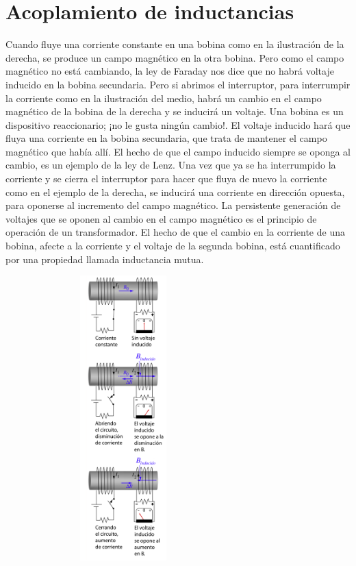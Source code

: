 \documentclass[a4paper,11pt]{report}
\begin{document}
\chapter{Acoplamiento de inductancias}
Cuando fluye una corriente constante en una bobina como en la ilustración de la derecha, se produce un campo magnético en la otra bobina. Pero como el campo magnético no está cambiando, la ley de Faraday nos dice que no habrá voltaje inducido en la bobina secundaria. Pero si abrimos el interruptor, para interrumpir la corriente como en la ilustración del medio, habrá un cambio en el campo magnético de la bobina de la derecha y se inducirá un voltaje. Una bobina es un dispositivo reaccionario; ¡no le gusta ningún cambio!. El voltaje inducido hará que fluya una corriente en la bobina secundaria, que trata de mantener el campo magnético que había allí. El hecho de que el campo inducido siempre se oponga al cambio, es un ejemplo de la ley de Lenz. Una vez que ya se ha interrumpido la corriente y se cierra el interruptor para hacer que fluya de nuevo la corriente como en el ejemplo de la derecha, se inducirá una corriente en dirección opuesta, para oponerse al incremento del campo magnético. La persistente generación de voltajes que se oponen al cambio en el campo magnético es el principio de operación de un transformador. El hecho de que el cambio en la corriente de una bobina, afecte a la corriente y el voltaje de la segunda bobina, está cuantificado por una propiedad llamada inductancia mutua.
\begin{figure}[H]
\centering
\includegraphics[height=11cm, width=7cm]{indmut.png}
\end{figure}
\end{document}
